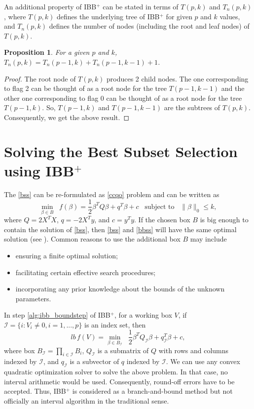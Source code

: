 \documentclass[10pt, letterpaper]{article}
\newtheorem{proposition}{Proposition}[section]
\begin{document}
An additional property of IBB$^{+}$ can be stated in terms of $T(p, k)$ and $T_{n}(p, k)$, where $T(p, k)$ defines the underlying tree of IBB$^{+}$ for given $p$ and $k$ values, and $T_{n}(p, k)$ defines the number of nodes (including the root and leaf nodes) of $T(p, k)$.
\begin{proposition}
For a given $p$ and $k$, $T_{n}(p,k)=T_{n}(p-1,k)+T_{n}(p-1,k-1)+1 $.
\end{proposition}
\begin{proof}
The root node of $T(p,k)$ produces 2 child nodes. The one corresponding to flag 2 can be thought of as a root node for the tree $T(p-1,k-1)$ and the other one corresponding to flag 0 can be thought of as a root node for the tree $T(p-1,k)$. So, $T(p-1,k)$ and $T(p-1,k-1)$ are the subtrees of $T(p,k)$. Consequently, we get the above result.
\end{proof}
\section{Solving the Best Subset Selection using IBB$^{+}$}
\label{sec:ibb_for_bss}
The \eqref{bss} can be re-formulated as \eqref{ccqo} problem and can be written as 
\begin{equation}\label{bbss}
    \min_{\beta \in B} \;\; f(\beta)=\frac{1}{2}\beta^{T}Q \beta + q^{T} \beta +c \;\;\; \text{subject to} \;\;\; \|\beta\|_{0} \leq k,   \tag{BBSS} 
\end{equation}
where $Q=2X^{T}X$, $q=-2X^{T}y$, and $c=y^{T}y$. If the chosen box $B$ is big enough to contain the solution of \eqref{bss}, then \eqref{bss} and \eqref{bbss} will have the same optimal solution (see \cite{bertsimasEtal:2015}). Common reasons to use the additional box $B$ may include
\begin{itemize}
    \item ensuring a finite optimal solution;
    \item facilitating certain effective search procedures;
    \item incorporating any prior knowledge about the bounds of the unknown parameters.
\end{itemize}
In step \ref{alg:ibb_boundstep} of IBB$^{+}$, for a working box $V$, if \( \mathcal{I}=\{ i : V_{i} \neq 0, i=1,...,p \} \) is an index set, then  
\[ lb \, f(V)= \min_{\beta \in B_{\mathcal{I}}} \; \; \frac{1}{2}\beta^{T}Q_{\mathcal{I}}\beta + q_{\mathcal{I}}^{T}\beta+c ,   \]
where box $B_{\mathcal{I}}=\prod_{i\in \mathcal{I}} B_{i}$, $Q_{\mathcal{I}}$ is a submatrix of $Q$ with rows and columns indexed by $\mathcal{I}$, and $q_{\mathcal{I}}$ is a subvector of $q$ indexed by $\mathcal{I}$.
We can use any convex quadratic optimization solver to solve the above problem. In that case, no interval arithmetic would be used. Consequently, round-off errors have to be accepted. Thus, IBB$^{+}$ is considered as a branch-and-bound method but not officially an interval algorithm in the traditional sense.
\end{document}
